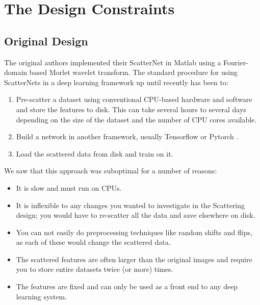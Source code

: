 \section{The Design Constraints}
\subsection{Original Design}
The original authors implemented their ScatterNet in Matlab \cite{oyallon_deep_2015} using
a Fourier-domain based Morlet wavelet transform.
The standard procedure for using ScatterNets in a deep learning
framework up until recently has been to:
\begin{enumerate}
  \item Pre-scatter a dataset using conventional CPU-based hardware and software
    and store the features to disk. This can take several hours to several days
    depending on the size of the dataset and the number of CPU cores available.
  \item Build a network in another framework, usually Tensorflow \cite{abadi_tensorflow:_2015}
    or Pytorch \cite{paszke_automatic_2017}.
  \item Load the scattered data from disk and train on it.
\end{enumerate}
We saw that this approach was suboptimal for a number of reasons:
\begin{itemize}
  \item It is slow and must run on CPUs.
  \item It is inflexible to any changes you wanted to investigate in the
    Scattering design; you would have to re-scatter all the data and save
    elsewhere on disk.
  \item You can not easily do preprocessing techniques like random shifts and
    flips, as each of these would change the scattered data.
  \item The scattered features are often larger than the original images and
    require you to store entire datasets twice (or more) times.
  \item The features are fixed and can only be used as a front end to any
    deep learning system.
\end{itemize}

